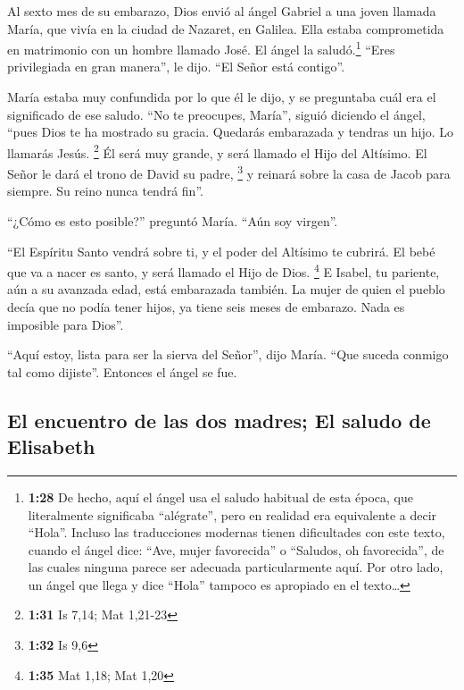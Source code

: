  Al sexto mes de su embarazo, Dios envió al ángel Gabriel
a una joven llamada María, que vivía en la ciudad de Nazaret, en
Galilea.  Ella estaba comprometida en matrimonio con un
hombre llamado José.  El ángel la saludó.\footnote{\textbf{1:28}
  De hecho, aquí el ángel usa el saludo habitual de esta época, que
  literalmente significaba ``alégrate'', pero en realidad era
  equivalente a decir ``Hola''. Incluso las traducciones modernas tienen
  dificultades con este texto, cuando el ángel dice: ``Ave, mujer
  favorecida'' o ``Saludos, oh favorecida'', de las cuales ninguna
  parece ser adecuada particularmente aquí. Por otro lado, un ángel que
  llega y dice ``Hola'' tampoco es apropiado en el texto\ldots{}} ``Eres
privilegiada en gran manera'', le dijo. ``El Señor está contigo''.

 María estaba muy confundida por lo que él le dijo, y se
preguntaba cuál era el significado de ese saludo.  ``No
te preocupes, María'', siguió diciendo el ángel, ``pues Dios te ha
mostrado su gracia.  Quedarás embarazada y tendras un
hijo. Lo llamarás Jesús. \footnote{\textbf{1:31} Is 7,14; Mat 1,21-23}
 Él será muy grande, y será llamado el Hijo del Altísimo.
El Señor le dará el trono de David su padre, \footnote{\textbf{1:32} Is
  9,6}  y reinará sobre la casa de Jacob para siempre. Su
reino nunca tendrá fin''.

 ``¿Cómo es esto posible?'' preguntó María. ``Aún soy
virgen''.

 ``El Espíritu Santo vendrá sobre ti, y el poder del
Altísimo te cubrirá. El bebé que va a nacer es santo, y será llamado el
Hijo de Dios. \footnote{\textbf{1:35} Mat 1,18; Mat 1,20}
 E Isabel, tu pariente, aún a su avanzada edad, está
embarazada también. La mujer de quien el pueblo decía que no podía tener
hijos, ya tiene seis meses de embarazo.  Nada es
imposible para Dios''.

 ``Aquí estoy, lista para ser la sierva del Señor'', dijo
María. ``Que suceda conmigo tal como dijiste''. Entonces el ángel se
fue.

\hypertarget{el-encuentro-de-las-dos-madres-el-saludo-de-elisabeth}{%
\subsection{El encuentro de las dos madres; El saludo de
Elisabeth}\label{el-encuentro-de-las-dos-madres-el-saludo-de-elisabeth}}

